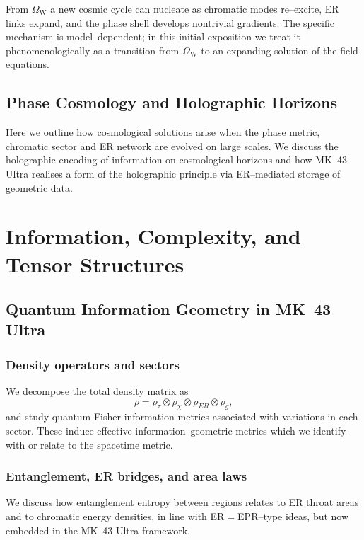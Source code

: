 \documentclass[11pt]{book}
\newcommand{\Wcore}{\Omega_{\mathrm{W}}}
\begin{document}
From $\Wcore$ a new cosmic cycle can nucleate as chromatic modes re--excite, ER links expand, and the phase shell develops nontrivial gradients.
The specific mechanism is model--dependent; in this initial exposition we treat it phenomenologically as a transition from $\Wcore$ to an expanding solution of the field equations.

\chapter{Phase Cosmology and Holographic Horizons}

Here we outline how cosmological solutions arise when the phase metric, chromatic sector and ER network are evolved on large scales.
We discuss the holographic encoding of information on cosmological horizons and how MK--43 Ultra realises a form of the holographic principle via ER--mediated storage of geometric data.

\part{Information, Complexity, and Tensor Structures}

\chapter{Quantum Information Geometry in MK--43 Ultra}

\section{Density operators and sectors}

We decompose the total density matrix as
\begin{equation}
  \rho = \rho_\tau \otimes \rho_\chi \otimes \rho_{ER} \otimes \rho_g,
\end{equation}
and study quantum Fisher information metrics associated with variations in each sector.
These induce effective information--geometric metrics which we identify with or relate to the spacetime metric.

\section{Entanglement, ER bridges, and area laws}

We discuss how entanglement entropy between regions relates to ER throat areas and to chromatic energy densities, in line with ER$=$EPR--type ideas, but now embedded in the MK--43 Ultra framework.
\end{document}
